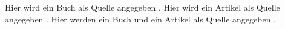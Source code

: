 \documentclass[12pt,a5paper]{article}
\begin{document}
Hier wird ein Buch als Quelle angegeben \cite[2]{Oechsner.2015}. 
Hier wird ein Artikel als Quelle angegeben \cite{Muster.2020}. 
Hier werden ein Buch und ein Artikel als Quelle angegeben \cite{Oechsner.2015, Muster.2020}. 
\printbibliography
\end{document}
